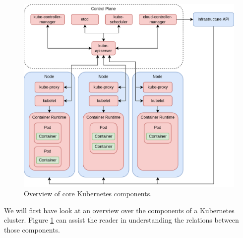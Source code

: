 \begin{figure}[H]
  \centering
  \includegraphics[width=\linewidth]{resources/kubernetes-overview.drawio.png}
  \caption{Overview of core Kubernetes components.}
  \label{fig:kubernetes-overview}
\end{figure}

We will first have look at an overview over the components of a Kubernetes
cluster. Figure \ref{fig:kubernetes-overview} can assist the reader in
understanding the relations between those components.

